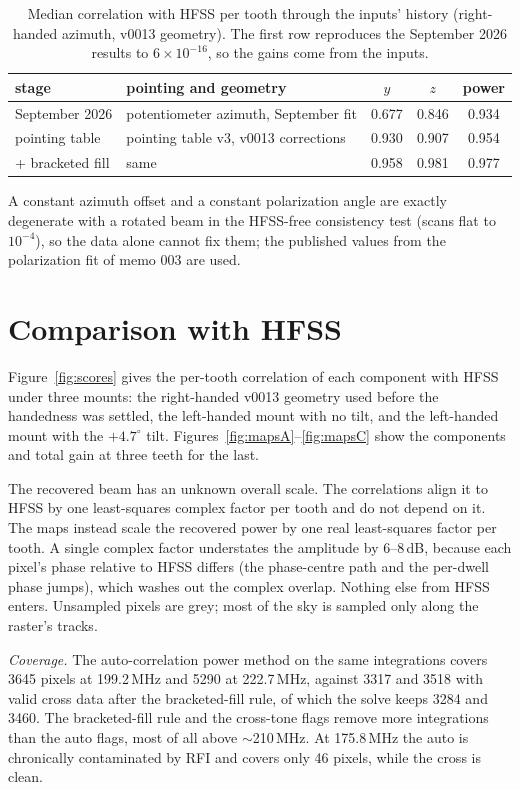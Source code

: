 \documentclass{aastex631}
\begin{document}
\begin{table}[h]
\centering
\caption{Median correlation with HFSS per tooth through the inputs' history (right-handed azimuth, v0013
  geometry). The first row reproduces the September 2026 results to $6\times10^{-16}$, so the gains come from
  the inputs.}
\label{tab:history}
\begin{tabular}{llccc}
\hline
stage & pointing and geometry & $y$ & $z$ & power \\
\hline
September 2026 & potentiometer azimuth, September fit & 0.677 & 0.846 & 0.934 \\
pointing table & pointing table v3, v0013 corrections & 0.930 & 0.907 & 0.954 \\
+ bracketed fill & same & 0.958 & 0.981 & 0.977 \\
\hline
\end{tabular}
\end{table}

A constant azimuth offset and a constant polarization angle are exactly degenerate with a rotated beam in the
HFSS-free consistency test (scans flat to $10^{-4}$), so the data alone cannot fix them; the published values
from the polarization fit of memo 003 are used.

\section{Comparison with HFSS} \label{sec:hfss}
Figure~\ref{fig:scores} gives the per-tooth correlation of each component with HFSS under three mounts: the
right-handed v0013 geometry used before the handedness was settled, the left-handed mount with no tilt, and the
left-handed mount with the $+4.7^\circ$ tilt. Figures~\ref{fig:mapsA}--\ref{fig:mapsC} show the components and
total gain at three teeth for the last.

The recovered beam has an unknown overall scale. The correlations align it to HFSS by one least-squares complex
factor per tooth and do not depend on it. The maps instead scale the recovered power by one real least-squares
factor per tooth. A single complex factor understates the amplitude by 6--8\,dB, because each pixel's phase
relative to HFSS differs (the phase-centre path and the per-dwell phase jumps), which washes out the complex
overlap. Nothing else from HFSS enters. Unsampled pixels are grey; most of the sky is sampled only along the
raster's tracks.

\textit{Coverage.} The auto-correlation power method on the same integrations covers 3645 pixels at 199.2\,MHz
and 5290 at 222.7\,MHz, against 3317 and 3518 with valid cross data after the bracketed-fill rule, of which the
solve keeps 3284 and 3460. The bracketed-fill rule and the cross-tone flags remove more integrations than the
auto flags, most of all above $\sim$210\,MHz. At 175.8\,MHz the auto is chronically contaminated by RFI and
covers only 46 pixels, while the cross is clean.
\end{document}
